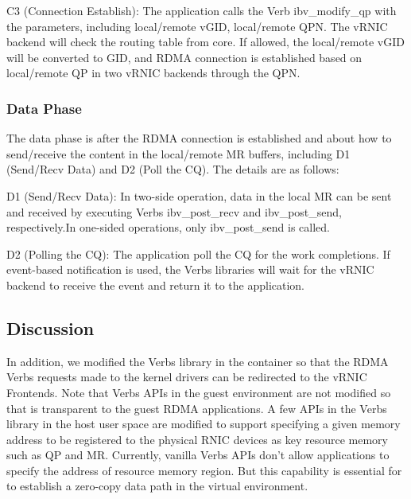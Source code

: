 C3 (Connection Establish): The application calls the Verb ibv\_modify\_qp with the parameters, including local/remote vGID, local/remote QPN. The vRNIC backend will check the routing table from \sys core. If allowed, the local/remote vGID will be converted to GID, and RDMA connection is established based on local/remote QP in two vRNIC backends through the QPN. 

\subsubsection{Data Phase}

The data phase is after the RDMA connection is established and about how to send/receive the content in the local/remote MR buffers, including D1 (Send/Recv Data) and D2 (Poll the CQ). The details are as follows:


D1 (Send/Recv Data): In two-side operation, data in the local MR can be sent and received by executing Verbs ibv\_post\_recv and ibv\_post\_send, respectively.In one-sided operations, only ibv\_post\_send is called.


D2 (Polling the CQ): The application poll the CQ for the work completions. If event-based notification is used, the Verbs libraries will wait for the vRNIC backend to receive the event and return it to the application.

\subsection{Discussion}

In addition, we modified the Verbs library in the container so that the RDMA Verbs requests made to the kernel drivers can be redirected to the vRNIC Frontends. Note that Verbs APIs in the guest environment are not modified so that \sys is transparent to the guest RDMA applications. A few APIs in the Verbs library in the host user space are modified to support specifying a given memory address to be registered to the physical RNIC devices as key resource memory such as QP and MR. Currently, vanilla Verbs APIs don't allow applications to specify the address of resource memory region. But this capability is essential for \sys to establish a zero-copy data path in the virtual environment.



